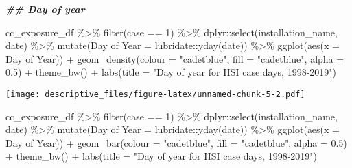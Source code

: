 \documentclass[
]{article}
\newenvironment{Shaded}{\begin{snugshade}}{\end{snugshade}}
\newcommand{\AttributeTok}[1]{\textcolor[rgb]{0.77,0.63,0.00}{#1}}
\newcommand{\DecValTok}[1]{\textcolor[rgb]{0.00,0.00,0.81}{#1}}
\newcommand{\DocumentationTok}[1]{\textcolor[rgb]{0.56,0.35,0.01}{\textbf{\textit{#1}}}}
\newcommand{\FloatTok}[1]{\textcolor[rgb]{0.00,0.00,0.81}{#1}}
\newcommand{\FunctionTok}[1]{\textcolor[rgb]{0.00,0.00,0.00}{#1}}
\newcommand{\NormalTok}[1]{#1}
\newcommand{\OtherTok}[1]{\textcolor[rgb]{0.56,0.35,0.01}{#1}}
\newcommand{\SpecialCharTok}[1]{\textcolor[rgb]{0.00,0.00,0.00}{#1}}
\newcommand{\StringTok}[1]{\textcolor[rgb]{0.31,0.60,0.02}{#1}}
\begin{document}
\begin{Shaded}
\begin{Highlighting}[]
\DocumentationTok{\#\# Day of year}

\NormalTok{cc\_exposure\_df }\SpecialCharTok{\%\textgreater{}\%}
  \FunctionTok{filter}\NormalTok{(case }\SpecialCharTok{==} \DecValTok{1}\NormalTok{) }\SpecialCharTok{\%\textgreater{}\%} 
\NormalTok{  dplyr}\SpecialCharTok{::}\FunctionTok{select}\NormalTok{(installation\_name, date) }\SpecialCharTok{\%\textgreater{}\%} 
  \FunctionTok{mutate}\NormalTok{(}\StringTok{\textasciigrave{}}\AttributeTok{Day of Year}\StringTok{\textasciigrave{}} \OtherTok{=}\NormalTok{ lubridate}\SpecialCharTok{::}\FunctionTok{yday}\NormalTok{(date)) }\SpecialCharTok{\%\textgreater{}\%} 
  \FunctionTok{ggplot}\NormalTok{(}\FunctionTok{aes}\NormalTok{(}\AttributeTok{x =} \StringTok{\textasciigrave{}}\AttributeTok{Day of Year}\StringTok{\textasciigrave{}}\NormalTok{)) }\SpecialCharTok{+}
  \FunctionTok{geom\_density}\NormalTok{(}\AttributeTok{colour =} \StringTok{"cadetblue"}\NormalTok{, }\AttributeTok{fill =} \StringTok{"cadetblue"}\NormalTok{, }\AttributeTok{alpha =} \FloatTok{0.5}\NormalTok{) }\SpecialCharTok{+}
  \FunctionTok{theme\_bw}\NormalTok{() }\SpecialCharTok{+}
  \FunctionTok{labs}\NormalTok{(}\AttributeTok{title =} \StringTok{"Day of year for HSI case days, 1998{-}2019"}\NormalTok{)}
\end{Highlighting}
\end{Shaded}

\texttt{[image: descriptive\_files/figure-latex/unnamed-chunk-5-2.pdf]}

\begin{Shaded}
\begin{Highlighting}[]
\NormalTok{cc\_exposure\_df }\SpecialCharTok{\%\textgreater{}\%}
  \FunctionTok{filter}\NormalTok{(case }\SpecialCharTok{==} \DecValTok{1}\NormalTok{) }\SpecialCharTok{\%\textgreater{}\%} 
\NormalTok{  dplyr}\SpecialCharTok{::}\FunctionTok{select}\NormalTok{(installation\_name, date) }\SpecialCharTok{\%\textgreater{}\%} 
  \FunctionTok{mutate}\NormalTok{(}\StringTok{\textasciigrave{}}\AttributeTok{Day of Year}\StringTok{\textasciigrave{}} \OtherTok{=}\NormalTok{ lubridate}\SpecialCharTok{::}\FunctionTok{yday}\NormalTok{(date)) }\SpecialCharTok{\%\textgreater{}\%} 
  \FunctionTok{ggplot}\NormalTok{(}\FunctionTok{aes}\NormalTok{(}\AttributeTok{x =} \StringTok{\textasciigrave{}}\AttributeTok{Day of Year}\StringTok{\textasciigrave{}}\NormalTok{)) }\SpecialCharTok{+}
  \FunctionTok{geom\_bar}\NormalTok{(}\AttributeTok{colour =} \StringTok{"cadetblue"}\NormalTok{, }\AttributeTok{fill =} \StringTok{"cadetblue"}\NormalTok{, }\AttributeTok{alpha =} \FloatTok{0.5}\NormalTok{) }\SpecialCharTok{+}
  \FunctionTok{theme\_bw}\NormalTok{() }\SpecialCharTok{+}
  \FunctionTok{labs}\NormalTok{(}\AttributeTok{title =} \StringTok{"Day of year for HSI case days, 1998{-}2019"}\NormalTok{)}
\end{Highlighting}
\end{Shaded}
\end{document}
